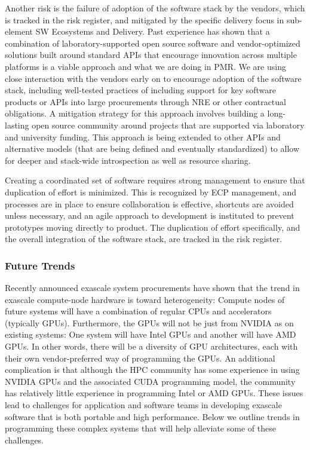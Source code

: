 Another risk is the failure of adoption of the software stack by the vendors, which is tracked in the risk register, and mitigated by the specific delivery focus in sub-element SW Ecosystems and Delivery. Past experience has shown that a combination of laboratory-supported open source software and vendor-optimized solutions built around standard APIs that encourage innovation across multiple platforms is a viable approach and what we are doing in PMR. We are using close interaction with the vendors early on to encourage adoption of the software stack, including well-tested practices of including support for key software products or APIs into large procurements through NRE or other contractual obligations. A mitigation strategy for this approach involves building a long-lasting open source community around projects that are supported via laboratory and university funding. This approach is being extended to other APIs and alternative models (that are being defined and eventually standardized) to allow for deeper and stack-wide introspection as well as resource sharing.

Creating a coordinated set of software requires strong management to ensure that duplication of effort is minimized. This is recognized by ECP management, and processes are in place to ensure collaboration is effective, shortcuts are avoided unless necessary, and an agile approach to development is instituted to prevent prototypes moving directly to product. The duplication of effort specifically, and the overall integration of the software stack, are tracked in the risk register. 

\subsubsection{Future Trends}
Recently announced exascale system procurements have shown that the
trend in exascale compute-node hardware is toward heterogeneity:
Compute nodes of future systems will have a combination of regular
CPUs and accelerators (typically GPUs). Furthermore, the GPUs will not
be just from NVIDIA as on existing systems: One system will have Intel
GPUs and another will have AMD GPUs. In other words, there will be a
diversity of GPU architectures, each with their own vendor-preferred
way of programming the GPUs. An additional complication
is that although the HPC community has some experience in using NVIDIA
GPUs and the associated CUDA programming model, the community has relatively
little experience in programming Intel or AMD GPUs.  These
issues lead to challenges for application and software teams in
developing exascale software that is both portable and high performance. Below
we outline trends in programming these complex systems that will help
alleviate some of these challenges.

